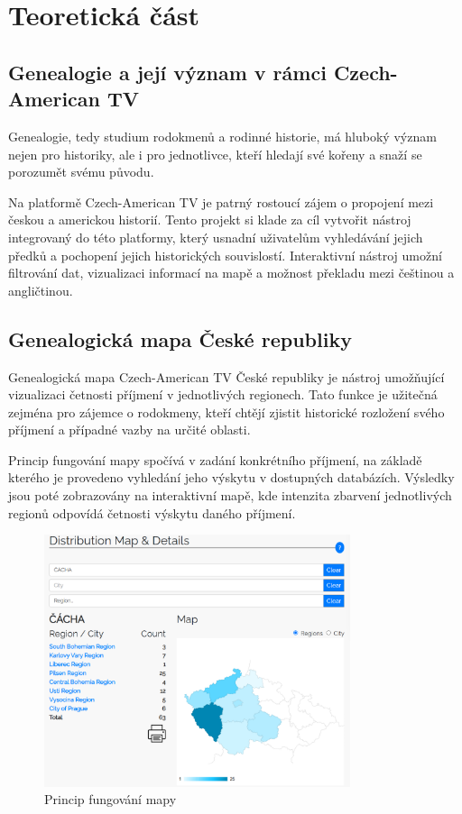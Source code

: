 \documentclass[czech, ba, kiv, he]{fasthesis}
\begin{document}
\chapter{Teoretická část}

\section{Genealogie a její význam v rámci Czech-American TV}  
Genealogie, tedy studium rodokmenů a rodinné historie, má hluboký význam nejen pro historiky, ale i pro jednotlivce, kteří hledají své kořeny a snaží se porozumět svému původu.  

Na platformě Czech-American TV je patrný rostoucí zájem o propojení mezi českou a americkou historií. Tento projekt si klade za cíl vytvořit nástroj integrovaný do této platformy, který usnadní uživatelům vyhledávání jejich předků a pochopení jejich historických souvislostí. Interaktivní nástroj umožní filtrování dat, vizualizaci informací na mapě a možnost překladu mezi češtinou a angličtinou.  


\section{Genealogická mapa České republiky}

Genealogická mapa Czech-American TV České republiky je nástroj umožňující vizualizaci četnosti příjmení v jednotlivých regionech. Tato funkce je užitečná zejména pro zájemce o rodokmeny, kteří chtějí zjistit historické rozložení svého příjmení a případné vazby na určité oblasti.

Princip fungování mapy spočívá v zadání konkrétního příjmení, na základě kterého je provedeno vyhledání jeho výskytu v dostupných databázích. Výsledky jsou poté zobrazovány na interaktivní mapě, kde intenzita zbarvení jednotlivých regionů odpovídá četnosti výskytu daného příjmení.

\begin{figure}[h]  
    \centering  
    \includegraphics[width=0.8\textwidth]{genealogy_map.png}  
    \caption{Princip fungování mapy}  
\end{figure}
\end{document}
